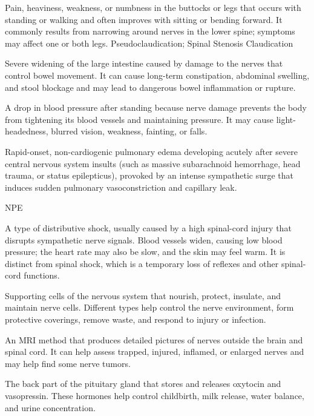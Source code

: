  Pain, heaviness, weakness, or numbness in the buttocks or legs that occurs with standing or walking and often improves with sitting or bending forward. It commonly results from narrowing around nerves in the lower spine; symptoms may affect one or both legs.
\synonyms
Pseudoclaudication; Spinal Stenosis Claudication

 Severe widening of the large intestine caused by damage to the nerves that control bowel movement. It can cause long-term constipation, abdominal swelling, and stool blockage and may lead to dangerous bowel inflammation or rupture.

 A drop in blood pressure after standing because nerve damage prevents the body from tightening its blood vessels and maintaining pressure. It may cause light-headedness, blurred vision, weakness, fainting, or falls.

 Rapid-onset, non-cardiogenic pulmonary edema developing acutely after severe central nervous system insults (such as massive subarachnoid hemorrhage, head trauma, or status epilepticus), provoked by an intense sympathetic surge that induces sudden pulmonary vasoconstriction and capillary leak.

\synonyms
NPE

 A type of distributive shock, usually caused by a high spinal-cord injury that disrupts sympathetic nerve signals. Blood vessels widen, causing low blood pressure; the heart rate may also be slow, and the skin may feel warm. It is distinct from spinal shock, which is a temporary loss of reflexes and other spinal-cord functions.

 Supporting cells of the nervous system that nourish, protect, insulate, and maintain nerve cells. Different types help control the nerve environment, form protective coverings, remove waste, and respond to injury or infection.

 An MRI method that produces detailed pictures of nerves outside the brain and spinal cord. It can help assess trapped, injured, inflamed, or enlarged nerves and may help find some nerve tumors.

 The back part of the pituitary gland that stores and releases oxytocin and vasopressin. These hormones help control childbirth, milk release, water balance, and urine concentration.

